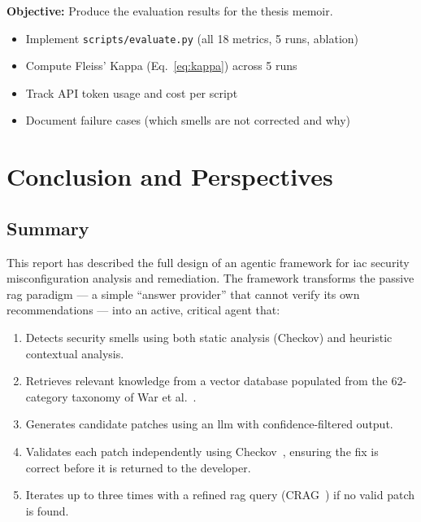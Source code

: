 \documentclass[12pt, a4paper]{report}
\begin{document}
\textbf{Objective:} Produce the evaluation results for the thesis memoir.

\begin{itemize}
  \item Implement \texttt{scripts/evaluate.py} (all 18 metrics, 5 runs, ablation)
  \item Compute Fleiss' Kappa (Eq.~\ref{eq:kappa}) across 5 runs
  \item Track API token usage and cost per script~\citep{devito2025secllm}
  \item Document failure cases (which smells are not corrected and why)
\end{itemize}

\chapter{Conclusion and Perspectives}
\label{chap:conclusion}

\section{Summary}

This report has described the full design of an agentic framework for \gls{iac}
security misconfiguration analysis and remediation. The framework transforms the
passive \gls{rag} paradigm --- a simple ``answer provider'' that cannot verify its
own recommendations --- into an active, critical agent that:

\begin{enumerate}
  \item Detects security smells using both static analysis (Checkov) and heuristic
  contextual analysis.
  \item Retrieves relevant knowledge from a vector database populated from the
  62-category taxonomy of War et al.~\citep{war2025taxonomy}.
  \item Generates candidate patches using an \gls{llm} with confidence-filtered output.
  \item Validates each patch independently using Checkov~\citep{checkov2024},
  ensuring the fix is correct before it is returned to the developer.
  \item Iterates up to three times with a refined \gls{rag} query
  (CRAG~\citep{yao2024crag}) if no valid patch is found.
\end{enumerate}
\end{document}
